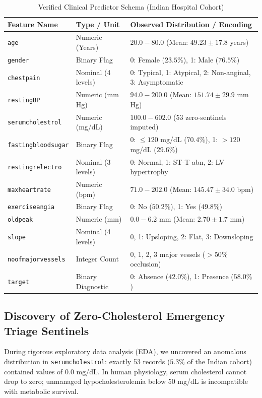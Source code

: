 \documentclass[conference]{IEEEtran}
\begin{document}
\begin{table}[htbp]
\caption{Verified Clinical Predictor Schema (Indian Hospital Cohort)}
\label{tab:india_dictionary}
\centering
\small
\begin{tabularx}{\columnwidth}{l l X}
\toprule
\textbf{Feature Name} & \textbf{Type / Unit} & \textbf{Observed Distribution / Encoding} \\
\midrule
\texttt{age} & Numeric (Years) & $20.0 - 80.0$ (Mean: $49.23 \pm 17.8$ years) \\
\texttt{gender} & Binary Flag & 0: Female ($23.5\%$), 1: Male ($76.5\%$) \\
\texttt{chestpain} & Nominal (4 levels) & 0: Typical, 1: Atypical, 2: Non-anginal, 3: Asymptomatic \\
\texttt{restingBP} & Numeric (mm Hg) & $94.0 - 200.0$ (Mean: $151.74 \pm 29.9$ mm Hg) \\
\texttt{serumcholestrol} & Numeric (mg/dL) & $100.0 - 602.0$ (53 zero-sentinels imputed) \\
\texttt{fastingbloodsugar} & Binary Flag & 0: $\le 120$ mg/dL ($70.4\%$), 1: $>120$ mg/dL ($29.6\%$) \\
\texttt{restingrelectro} & Nominal (3 levels) & 0: Normal, 1: ST-T abn, 2: LV hypertrophy \\
\texttt{maxheartrate} & Numeric (bpm) & $71.0 - 202.0$ (Mean: $145.47 \pm 34.0$ bpm) \\
\texttt{exerciseangia} & Binary Flag & 0: No ($50.2\%$), 1: Yes ($49.8\%$) \\
\texttt{oldpeak} & Numeric (mm) & $0.0 - 6.2$ mm (Mean: $2.70 \pm 1.7$ mm) \\
\texttt{slope} & Nominal (4 levels) & 0, 1: Upsloping, 2: Flat, 3: Downsloping \\
\texttt{noofmajorvessels} & Integer Count & 0, 1, 2, 3 major vessels ($>50\%$ occlusion) \\
\midrule
\texttt{target} & Binary Diagnostic & 0: Absence ($42.0\%$), 1: Presence ($58.0\%$) \\
\bottomrule
\end{tabularx}
\end{table}

\subsection{Discovery of Zero-Cholesterol Emergency Triage Sentinels}
During rigorous exploratory data analysis (EDA), we uncovered an anomalous distribution in \texttt{serumcholestrol}: exactly 53 records ($5.3\%$ of the Indian cohort) contained values of $0.0$ mg/dL. In human physiology, serum cholesterol cannot drop to zero; unmanaged hypocholesterolemia below 50 mg/dL is incompatible with metabolic survival.
\end{document}
